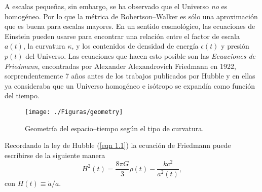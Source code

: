 \documentclass[a4paper,openright,10pt, oneside, final]{book}
\begin{document}
A escalas pequeñas, sin embargo, se ha observado que el Universo \textit{no} es homogéneo. Por lo que la métrica de Robertson--Walker es sólo una aproximación que es buena para escalas mayores. En un sentido cosmológico, las ecuaciones de Einstein pueden usarse para encontrar una relación entre el factor de escala $a(t)$, la curvatura $\kappa$, y los contenidos de densidad de energía $\epsilon(t)$ y presión $p(t)$ del Universo. Las ecuaciones que hacen esto posible son las \textit{Ecuaciones de Friedmann}, encontradas por Alexander Alexandrovich Friedmann en 1922, sorprendentemente 7 años antes de los trabajos publicados por Hubble y en ellas ya consideraba que un Universo homogéneo e isótropo se expandía como función del tiempo. 

\begin{figure}[h]
\centering
\texttt{[image: ./Figuras/geometry]}
\caption{\footnotesize{Geometría del espacio--tiempo según el tipo de curvatura.}}\label{Fig. 1.02}
\end{figure}

Recordando la ley de Hubble (\ref{eqn 1.1}) la ecuación de Friedmann puede escribirse de la siguiente manera
\begin{equation}
H^{2}(t) = \frac{8 \pi G}{3}\rho(t) 
-\frac{k c^{2}}{a^{2}(t)},\label{eqn 1.19}
\end{equation}
con $H(t) \equiv \dot{a}/a$.
\end{document}
